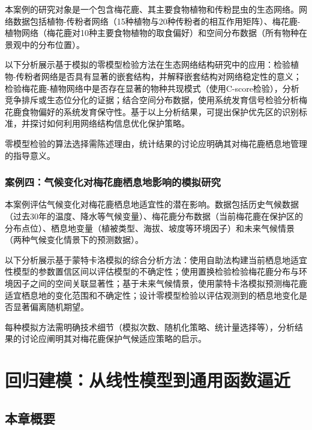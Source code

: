 \documentclass[
  twoside,12pt,fontset=none]{ctexbook}
\begin{document}
本案例的研究对象是一个包含梅花鹿、其主要食物植物和传粉昆虫的生态网络。网络数据包括植物-传粉者网络（15种植物与20种传粉者的相互作用矩阵）、梅花鹿-植物网络（梅花鹿对10种主要食物植物的取食偏好）和空间分布数据（所有物种在景观中的分布位置）。

以下分析展示基于模拟的零模型检验方法在生态网络结构研究中的应用：检验植物-传粉者网络是否具有显著的嵌套结构，并解释嵌套结构对网络稳定性的意义；检验梅花鹿-植物网络中是否存在显著的物种共现模式（使用C-score检验），分析竞争排斥或生态位分化的证据；结合空间分布数据，使用系统发育信号检验分析梅花鹿食物偏好的系统发育保守性。基于以上分析结果，可提出保护优先区的识别标准，并探讨如何利用网络结构信息优化保护策略。

零模型检验的算法选择需陈述理由，统计结果的讨论应明确其对梅花鹿栖息地管理的指导意义。

\hypertarget{ux6848ux4f8bux56dbux6c14ux5019ux53d8ux5316ux5bf9ux6885ux82b1ux9e7fux6816ux606fux5730ux5f71ux54cdux7684ux6a21ux62dfux7814ux7a76}{%
\subsection{案例四：气候变化对梅花鹿栖息地影响的模拟研究}\label{ux6848ux4f8bux56dbux6c14ux5019ux53d8ux5316ux5bf9ux6885ux82b1ux9e7fux6816ux606fux5730ux5f71ux54cdux7684ux6a21ux62dfux7814ux7a76}}

本案例评估气候变化对梅花鹿栖息地适宜性的潜在影响。数据包括历史气候数据（过去30年的温度、降水等气候变量）、梅花鹿分布数据（当前梅花鹿在保护区的分布点位）、栖息地变量（植被类型、海拔、坡度等环境因子）和未来气候情景（两种气候变化情景下的预测数据）。

以下分析展示基于蒙特卡洛模拟的综合分析方法：使用自助法构建当前栖息地适宜性模型的参数置信区间以评估模型的不确定性；使用置换检验检验梅花鹿分布与环境因子之间的空间关联显著性；基于未来气候情景，使用蒙特卡洛模拟预测梅花鹿适宜栖息地的变化范围和不确定性；设计零模型检验以评估观测到的栖息地变化是否显著偏离随机期望。

每种模拟方法需明确技术细节（模拟次数、随机化策略、统计量选择等），分析结果的讨论应阐明其对梅花鹿保护气候适应策略的启示。

\hypertarget{ch08}{%
\chapter{回归建模：从线性模型到通用函数逼近}\label{ch08}}

\hypertarget{ux672cux7ae0ux6982ux8981-6}{%
\section{本章概要}\label{ux672cux7ae0ux6982ux8981-6}}
\end{document}
